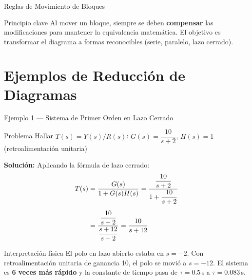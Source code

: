 \documentclass[aspectratio=169,xcolor=dvipsnames]{beamer}
\begin{document}
\begin{frame}{Reglas de Movimiento de Bloques}  
    \begin{alertblock}{Principio clave}
        Al mover un bloque, siempre se deben \textbf{compensar} las modificaciones para mantener la equivalencia matem\'atica. El objetivo es transformar el diagrama a formas reconocibles (serie, paralelo, lazo cerrado).
    \end{alertblock}
\end{frame}

\section{Ejemplos de Reducci\'on de Diagramas}

\begin{frame}{Ejemplo 1 --- Sistema de Primer Orden en Lazo Cerrado}
    \begin{exampleblock}{Problema}
        Hallar $T(s) = Y(s)/R(s)$: \quad $G(s) = \dfrac{10}{s+2}$, \quad $H(s) = 1$ (retroalimentaci\'on unitaria)
    \end{exampleblock}
    \vspace{0.4em}
    \textbf{Soluci\'on:} Aplicando la f\'ormula de lazo cerrado:
    \begin{align}
        T(s) &= \frac{G(s)}{1 + G(s) H(s)} = \frac{\dfrac{10}{s+2}}{1 + \dfrac{10}{s+2}} \notag \\[0.6em]
             &= \frac{\dfrac{10}{s+2}}{\dfrac{s+12}{s+2}} = \frac{10}{s+12}
    \end{align}
    \begin{block}{Interpretaci\'on f\'isica}
        El polo en lazo abierto estaba en $s=-2$. Con retroalimentaci\'on unitaria de ganancia 10, el polo se movi\'o a $s=-12$. El sistema es \textbf{6 veces m\'as r\'apido} y la constante de tiempo pasa de $\tau=0.5\,$s a $\tau=0.083\,$s.
    \end{block}
\end{frame}
\end{document}
